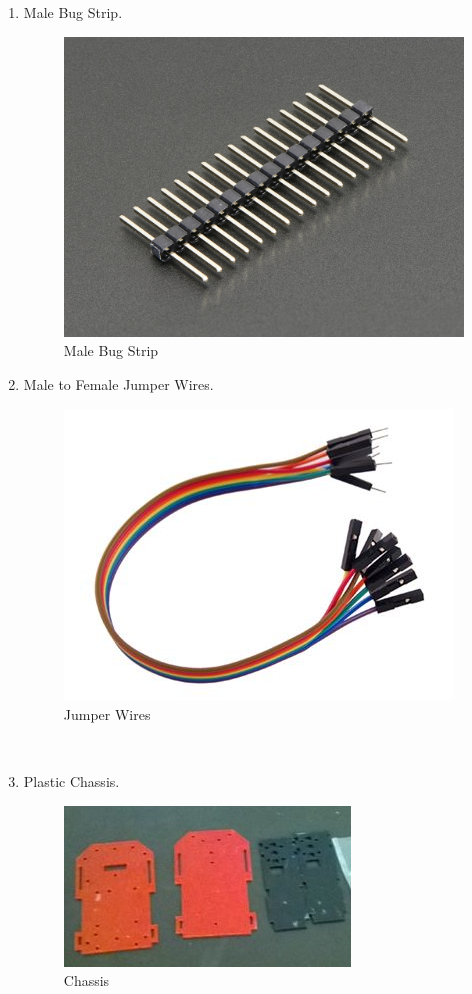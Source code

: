\documentclass[a4paper,12pt,oneside]{book}
\begin{document}
\begin{itemize}
\begin{enumerate}
      \newpage
    \item Male Bug Strip.
    \begin{figure}[!h]
        \centering
        \includegraphics[scale=0.12]{mbug}
        \caption{Male Bug Strip}
      \end{figure}
    \item Male to Female Jumper Wires.
    \begin{figure}[!h]
        \centering
        \includegraphics[scale=0.45]{jumper}
        \caption{Jumper Wires}
      \end{figure}\\
    \item Plastic Chassis.\\
     \par
    \begin{figure}[!h]
        \centering
        \includegraphics[scale=0.75]{chasis}
        \caption{Chassis}
      \end{figure}
      \newpage
  \end{enumerate}

\end{itemize}
\newpage
\end{document}
